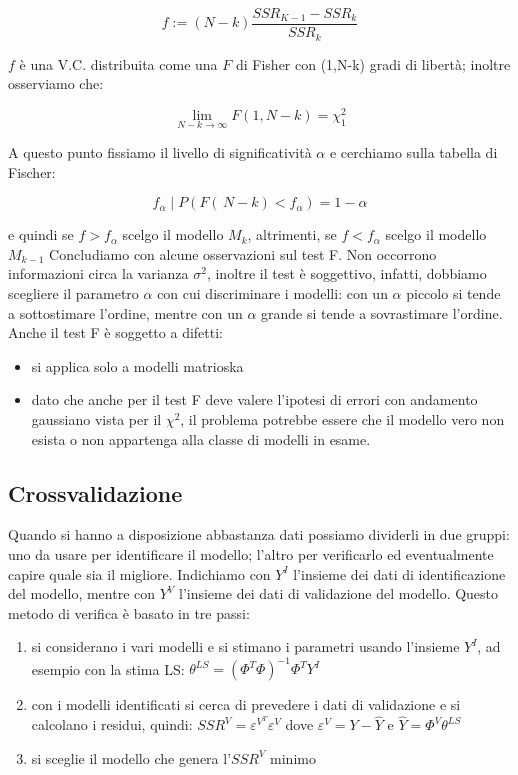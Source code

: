     \[ f:=(N-k)\frac{SSR_{K-1}-SSR_k}{SSR_k} \]

$f$ è una V.C. distribuita come una $F$ di Fisher con (1,N-k) gradi di libertà; inoltre osserviamo che:

    \[ \lim_{N-k\rightarrow\infty} {F(1,N-k)}=\chi_1^2 \]

A questo punto fissiamo il livello di significatività $\alpha$ e cerchiamo sulla tabella di Fischer:

    \[ f_\alpha \mid P(F(\,N-k)<f_\alpha)=1-\alpha \]

e quindi se $f>f_\alpha$ scelgo il modello $M_k$, altrimenti, se $f<f_\alpha$ scelgo il modello $M_{k-1}$
Concludiamo con alcune osservazioni sul test F. Non occorrono informazioni circa la varianza $\sigma^2$, inoltre il test è soggettivo, infatti, dobbiamo scegliere il parametro $\alpha$ con cui discriminare i modelli: con un $\alpha$ piccolo si tende a sottostimare l'ordine, mentre con un $\alpha$ grande si tende a sovrastimare l'ordine.\newline
Anche il test F è soggetto a difetti:
\begin{itemize}
  \item si applica solo a modelli matrioska
  \item dato che anche per il test F deve valere l'ipotesi di errori con andamento gaussiano vista per il $\chi^2$, il problema potrebbe essere che il modello vero non esista o non appartenga alla classe di modelli in esame.
\end{itemize}
\subsection{Crossvalidazione}
Quando si hanno a disposizione abbastanza dati possiamo dividerli in due gruppi: uno da usare per identificare il modello; l'altro per verificarlo ed eventualmente capire quale sia il migliore. Indichiamo con $Y^I$ l'insieme dei dati di identificazione del modello, mentre con $Y^V$ l'insieme dei dati di validazione del modello. Questo metodo di verifica è basato in tre passi:

\begin{enumerate}
  \item si considerano i vari modelli e si stimano i parametri usando l'insieme $Y^I$, ad esempio con la stima LS: $\theta^{LS}=(\Phi^T\Phi)^{-1}\Phi^TY^I$
  \item con i modelli identificati si cerca di prevedere i dati di validazione e si calcolano i residui, quindi: $SSR^V=\varepsilon^{V^T}\varepsilon^V$ dove $\varepsilon^V=Y-\hat{Y}$ e $\hat{Y}=\Phi^V\theta^{LS}$
  \item si sceglie il modello che genera l'$SSR^V$ minimo
\end{enumerate}

